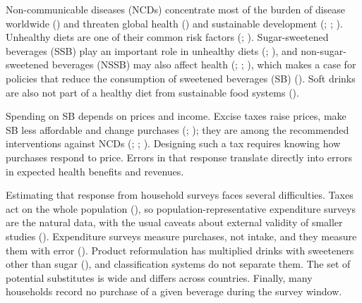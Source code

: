 \documentclass[
  11pt,
]{article}
\begin{document}
Non-communicable diseases (NCDs) concentrate most of the burden of
disease worldwide () and threaten global health
() and sustainable development
(;
;
). Unhealthy
diets are one of their common risk factors
(;
). Sugar-sweetened beverages (SSB) play an important role in
unhealthy diets (; ), and non-sugar-sweetened beverages (NSSB) may also affect health
(;
;
), which makes a
case for policies that reduce the consumption of sweetened beverages
(SB) (). Soft
drinks are also not part of a healthy diet from sustainable food systems
().

Spending on SB depends on prices and income. Excise taxes raise prices,
make SB less affordable and change purchases
(;
); they are among
the recommended interventions against NCDs
(; ;
).
Designing such a tax requires knowing how purchases respond to price.
Errors in that response translate directly into errors in expected
health benefits and revenues.

Estimating that response from household surveys faces several
difficulties. Taxes act on the whole population
(), so population-representative expenditure surveys are
the natural data, with the usual caveats about external validity of
smaller studies (). Expenditure surveys measure purchases, not intake,
and they measure them with error
(). Product
reformulation has multiplied drinks with sweeteners other than sugar
(), and classification systems do not separate them. The set of
potential substitutes is wide and differs across countries. Finally,
many households record no purchase of a given beverage during the survey
window.
\end{document}
